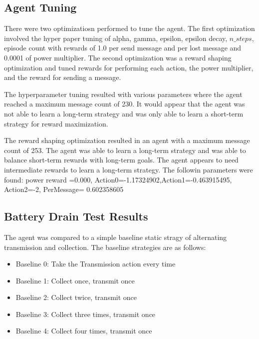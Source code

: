 \documentclass[10pt]{cai}
\begin{document}
\subsection{Agent Tuning}

There were two optimizatiosn performed to tune the agent.
The first optimization involved the hyper paper tuning of alpha, gamma, epsilon, epsilon decay, $n\_steps$, episode count with rewards of 1.0 per send message and  per lost message and 0.0001 of power multiplier.
The second optimization was a reward shaping optimization and tuned rewards for performing each action, the power multiplier, and the reward for sending a message.

The hyperparameter tuning resulted with various parameters where the agent reached a maximum message count of 230.
It would appear that the agent was not able to learn a long-term strategy and was only able to learn a short-term strategy for reward maximization.

The reward shaping optimization resulted in an agent with a maximum message count of 253.
The agent was able to learn a long-term strategy and was able to balance short-term rewards with long-term goals.
The agent appears to need intermediate rewards to learn a long-term strategy.
The followin parameters were found: power reward =0.000, Action0=-1.17324902,Action1=-0.463915495, Action2=-2, PerMessage=	0.602358605



\subsection{Battery Drain Test Results}

The agent was compared to a simple baseline static stragy of alternating transmission and collection.
The baseline strategies are as follows:
\begin{itemize}
  \item Baseline 0: Take the Transmission action every time
  \item Baseline 1: Collect once, transmit once
  \item Baseline 2: Collect twice, transmit once
  \item Baseline 3: Collect three times, transmit once
  \item Baseline 4: Collect four times, transmit once
\end{itemize}
\end{document}
